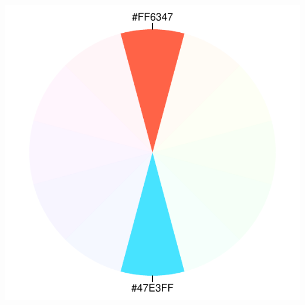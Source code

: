 \documentclass[12pt]{beamer}\usepackage[]{graphicx}\usepackage[]{color}
\newenvironment{knitrout}{}{} %
\begin{document}
\begin{frame}[fragile]
\begin{columns}[t]
\begin{column}{0.5\textwidth}
\begin{knitrout}
{\centering \includegraphics[width=.6\linewidth,height=.6\linewidth]{figure/tomato_complementary-1} 

}



\end{knitrout}
\end{column}
\end{columns}

\end{frame}

\end{document}
